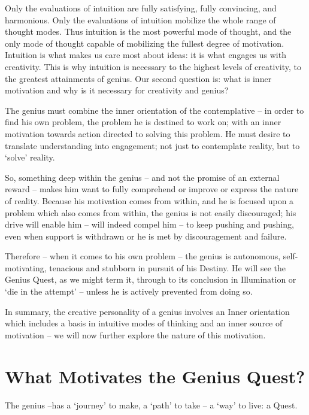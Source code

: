 \documentclass[
]{book}
\begin{document}
Only the evaluations of intuition are fully satisfying, fully convincing, and harmonious. Only the evaluations of intuition mobilize the whole range of thought modes. Thus intuition is the most powerful mode of thought, and the only mode of thought capable of mobilizing the fullest degree of motivation. Intuition is what makes us care most about ideas: it is what engages us with creativity. This is why intuition is necessary to the highest levels of creativity, to the greatest attainments of genius.
Our second question is: what is inner motivation and why is it necessary for creativity and genius?

The genius must combine the inner orientation of the contemplative -- in order to find his own problem, the problem he is destined to work on; with an inner motivation towards action directed to solving this problem. He must desire to translate understanding into engagement; not just to contemplate reality, but to `solve' reality.

So, something deep within the genius -- and not the promise of an external reward -- makes him want to fully comprehend or improve or express the nature of reality. Because his motivation comes from within, and he is focused upon a problem which also comes from within, the genius is not easily discouraged; his drive will enable him -- will indeed compel him -- to keep pushing and pushing, even when support is withdrawn or he is met by discouragement and failure.

Therefore -- when it comes to his own problem -- the genius is autonomous, self-motivating, tenacious and stubborn in pursuit of his Destiny. He will see the Genius Quest, as we might term it, through to its conclusion in Illumination or `die in the attempt' -- unless he is actively prevented from doing so.

In summary, the creative personality of a genius involves an Inner orientation which includes a basis in intuitive modes of thinking and an inner source of motivation -- we will now further explore the nature of this motivation.

\hypertarget{what-motivates-the-genius-quest}{%
\chapter{What Motivates the Genius Quest?}\label{what-motivates-the-genius-quest}}

The genius --has a `journey' to make, a `path' to take -- a `way' to live: a Quest.
\end{document}
